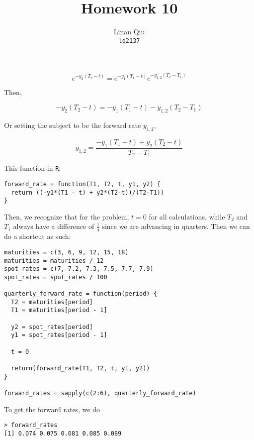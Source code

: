 \documentclass[11pt]{scrartcl}
\title{Homework 10}
\author{Linan Qiu\\\texttt{lq2137}}
\newcommand{\epowernb}[1]{\ensuremath{e^{#1}}}
\begin{document}
\maketitle

\section{}

\[\epowernb{-y_2(T_2-t)} = \epowernb{-y_1(T_1-t)}\epowernb{-y_{1,2}(T_2-T_1)}\]

Then,

\[-y_2(T_2 -t) = -y_1(T_1-t) -y_{1,2}(T_2-T_1)\]

Or setting the subject to be the forward rate $y_{1,2}$,

\[y_{1,2} = \frac{-y_1(T_1-t) + y_2(T_2-t)}{T_2-T_1}\]

This function in \texttt{R}:

\begin{lstlisting}
forward_rate = function(T1, T2, t, y1, y2) {
  return ((-y1*(T1 - t) + y2*(T2-t))/(T2-T1))
}
\end{lstlisting}

Then, we recognize that for the problem, $t=0$ for all calculations, while $T_2$ and $T_1$ always have a difference of $\frac{1}{4}$ since we are advancing in quarters. Then we can do a shortcut as such:

\begin{lstlisting}
maturities = c(3, 6, 9, 12, 15, 18)
maturities = maturities / 12
spot_rates = c(7, 7.2, 7.3, 7.5, 7.7, 7.9)
spot_rates = spot_rates / 100

quarterly_forward_rate = function(period) {
  T2 = maturities[period]
  T1 = maturities[period - 1]
  
  y2 = spot_rates[period]
  y1 = spot_rates[period - 1]
  
  t = 0
  
  return(forward_rate(T1, T2, t, y1, y2))
}

forward_rates = sapply(c(2:6), quarterly_forward_rate)
\end{lstlisting}

To get the forward rates, we do

\begin{lstlisting}
> forward_rates
[1] 0.074 0.075 0.081 0.085 0.089
\end{lstlisting}

\section{}
\end{document}
